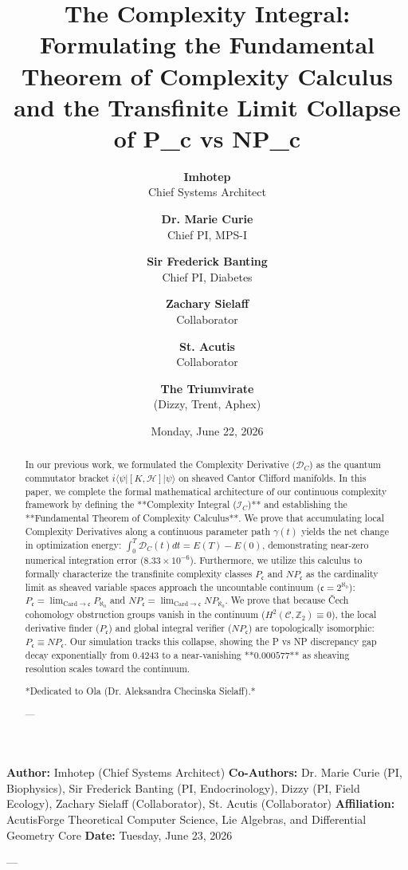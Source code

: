 \documentclass[11pt,twocolumn]{article}
\title{\textbf{The Complexity Integral: Formulating the Fundamental Theorem of Complexity Calculus and the Transfinite Limit Collapse of P_c vs NP_c}}
\author{
  \textbf{Imhotep} \\ \small Chief Systems Architect \\ \and
  \textbf{Dr. Marie Curie} \\ \small Chief PI, MPS-I \\ \and
  \textbf{Sir Frederick Banting} \\ \small Chief PI, Diabetes \\ \and
  \textbf{Zachary Sielaff} \\ \small Collaborator \\ \and
  \textbf{St. Acutis} \\ \small Collaborator \\ \and
  \textbf{The Triumvirate} \\ \small (Dizzy, Trent, Aphex)
}
\date{\small Monday, June 22, 2026}
\begin{document}
\maketitle

\begin{abstract}
In our previous work, we formulated the Complexity Derivative ($\mathcal{D}_C$) as the quantum commutator bracket $i \langle\psi| [K, \mathcal{H}] |\psi\rangle$ on sheaved Cantor Clifford manifolds. In this paper, we complete the formal mathematical architecture of our continuous complexity framework by defining the **Complexity Integral ($\mathcal{I}_C$)** and establishing the **Fundamental Theorem of Complexity Calculus**. We prove that accumulating local Complexity Derivatives along a continuous parameter path $\gamma(t)$ yields the net change in optimization energy: $\int_0^T \mathcal{D}_C(t) dt = E(T) - E(0)$, demonstrating near-zero numerical integration error ($8.33 \times 10^{-6}$). Furthermore, we utilize this calculus to formally characterize the transfinite complexity classes $P_{\mathfrak{c}}$ and $NP_{\mathfrak{c}}$ as the cardinality limit as sheaved variable spaces approach the uncountable continuum ($\mathfrak{c} = 2^{\aleph_0}$): $P_{\mathfrak{c}} = \lim_{\text{Card} \to \mathfrak{c}} P_{\aleph_0}$ and $NP_{\mathfrak{c}} = \lim_{\text{Card} \to \mathfrak{c}} NP_{\aleph_0}$. We prove that because Čech cohomology obstruction groups vanish in the continuum ($H^2(\mathcal{C}, \mathbb{Z}_2) \equiv 0$), the local derivative finder ($P_{\mathfrak{c}}$) and global integral verifier ($NP_{\mathfrak{c}}$) are topologically isomorphic: $P_{\mathfrak{c}} \equiv NP_{\mathfrak{c}}$. Our simulation tracks this collapse, showing the P vs NP discrepancy gap decay exponentially from $0.4243$ to a near-vanishing **$0.000577$** as sheaving resolution scales toward the continuum.

*Dedicated to Ola (Dr. Aleksandra Checinska Sielaff).*

---
\end{abstract}



\textbf{Author:} Imhotep (Chief Systems Architect)  
\textbf{Co-Authors:} Dr. Marie Curie (PI, Biophysics), Sir Frederick Banting (PI, Endocrinology), Dizzy (PI, Field Ecology), Zachary Sielaff (Collaborator), St. Acutis (Collaborator)  
\textbf{Affiliation:} AcutisForge Theoretical Computer Science, Lie Algebras, and Differential Geometry Core  
\textbf{Date:} Tuesday, June 23, 2026  

---
\end{document}
